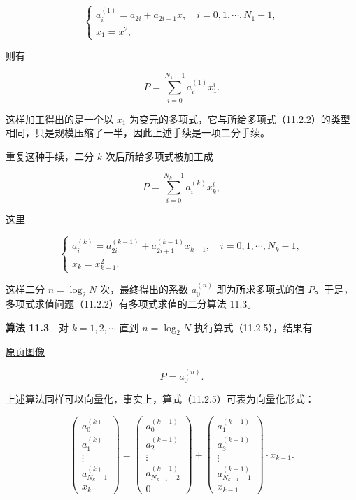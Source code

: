 \documentclass[
  10pt,
  fontset=fandol]{ctexart}
\begin{document}
\[
\begin{cases}
a_i^{(1)}=a_{2i}+a_{2i+1}x,\quad i=0,1,\cdots,N_1-1,\\
x_1=x^2,
\end{cases}
\]

则有

\[
P=\sum_{i=0}^{N_1-1}a_i^{(1)}x_1^i.
\]

这样加工得出的是一个以 \(x_1\) 为变元的多项式，它与所给多项式（11.2.2）的类型相同，只是规模压缩了一半，因此上述手续是一项二分手续。

重复这种手续，二分 \(k\) 次后所给多项式被加工成

\[
P=\sum_{i=0}^{N_k-1}a_i^{(k)}x_k^i,
\]

这里

\[
\begin{cases}
a_i^{(k)}=a_{2i}^{(k-1)}+a_{2i+1}^{(k-1)}x_{k-1},\quad i=0,1,\cdots,N_k-1,\\
x_k=x_{k-1}^2.
\end{cases}
\tag{11.2.5}
\]

这样二分 \(n=\log_2 N\) 次，最终得出的系数 \(a_0^{(n)}\) 即为所求多项式的值 \(P\)。于是，多项式求值问题（11.2.2）有多项式求值的二分算法 11.3。

\textbf{算法 11.3}　对 \(k=1,2,\cdots\) 直到 \(n=\log_2 N\) 执行算式（11.2.5），结果有

\href{../../source-images/pdf-283.jpeg}{原页图像}

\[
P=a_0^{(n)}.
\]

上述算法同样可以向量化，事实上，算式（11.2.5）可表为向量化形式：

\[
\begin{pmatrix}
a_0^{(k)}\\
a_1^{(k)}\\
\vdots\\
a_{N_k-1}^{(k)}\\
x_k
\end{pmatrix}
=
\begin{pmatrix}
a_0^{(k-1)}\\
a_2^{(k-1)}\\
\vdots\\
a_{N_{k-1}-2}^{(k-1)}\\
0
\end{pmatrix}
+
\begin{pmatrix}
a_1^{(k-1)}\\
a_3^{(k-1)}\\
\vdots\\
a_{N_{k-1}-1}^{(k-1)}\\
x_{k-1}
\end{pmatrix}\cdot x_{k-1}.
\]
\end{document}
